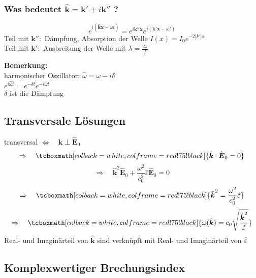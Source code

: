 \documentclass[titlepage,11pt,a4paper,ngerman]{report}
\renewcommand{\vec}[1]{\boldsymbol{#1}}
\renewcommand{\epsilon}{\varepsilon}
\newcommand{\rmbox}[1]{\tcboxmath[colback=white,colframe=red!75!black]{#1}}
\begin{document}
\subsubsection{Was bedeutet $ \hat{\vec{k}} = \vec{k}' + i \vec{k}'' $ ?}

\begin{equation*}
e^{i(\hat{\vec{k}} \vec{x} - \omega t)} = e^{i \vec{k}'' \vec{x}} e^{i(\vec{k}' \vec{x} - \omega t)}
\end{equation*}
Teil mit $ \vec{k}'' : $ Dämpfung, Absorption der Welle $ I(x) = I_0 e^{-2 |k'| x} $\\
Teil mit $ \vec{k}' : $ Ausbreitung der Welle mit $ \lambda = \frac{2 \pi}{f} $


\noindent
\textbf{Bemerkung:}\\
harmonischer Oszillator: $ \hat{\omega} = \omega - i \delta $\\
$ e^{i\hat{\omega t}} = e^{-\delta t} e^{-i \omega t} $\\
$ \delta $ ist die Dämpfung

\subsection{Transversale Lösungen}

transversal $ \Leftrightarrow \quad \hat{\vec{k}} \perp \hat{\vec{E}}_0 $ 
\begin{equation*}
\Rightarrow \quad \rmbox{\hat{\vec{k}} \cdot \hat{\vec{E}}_0 = 0}
\end{equation*}
\begin{equation*}
\Rightarrow \quad \hat{\vec{k}}^2 \hat{\vec{E}}_0 + \frac{\omega^2}{c_0^2} \hat{\epsilon} \hat{\vec{E}}_0 = 0
\end{equation*}
\begin{equation*}
\Rightarrow \quad \rmbox{\hat{\vec{k}}^2 = \frac{\omega^2}{c_0^2} \hat{\epsilon}}
\end{equation*}
\begin{equation*}
\Rightarrow \quad \rmbox{\omega(\hat{\vec{k}}) = c_0 \sqrt{\frac{\hat{\vec{k}}^2}{\hat{\epsilon}}}}
\end{equation*}
Real- und Imaginärteil von $ \hat{\vec{k}} $ sind verknüpft mit Real- und Imaginärteil von $ \hat{\epsilon} $

\subsection{Komplexwertiger Brechungsindex}
\end{document}
